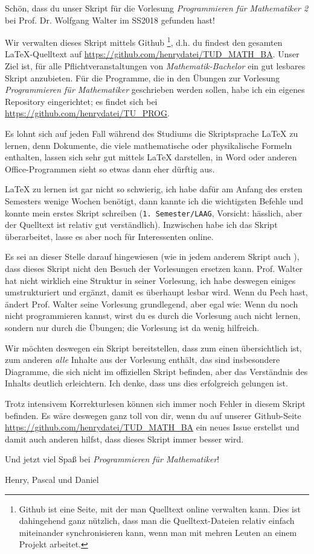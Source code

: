 Schön, dass du unser Skript für die Vorlesung \textit{Programmieren für Mathematiker 2} bei Prof. Dr. Wolfgang Walter im SS2018 gefunden hast!

Wir verwalten dieses Skript mittels Github \footnote{Github ist eine Seite, mit der man Quelltext online verwalten kann. Dies ist dahingehend ganz nützlich, dass man die Quelltext-Dateien relativ einfach miteinander synchronisieren kann, wenn man mit mehren Leuten an einem Projekt arbeitet.}, d.h. du findest den gesamten \LaTeX-Quelltext auf \url{https://github.com/henrydatei/TUD_MATH_BA}. Unser Ziel ist, für alle Pflichtveranstaltungen von \textit{Mathematik-Bachelor} ein gut lesbares Skript anzubieten. Für die Programme, die in den Übungen zur Vorlesung \textit{Programmieren für Mathematiker} geschrieben werden sollen, habe ich ein eigenes Repository eingerichtet; es findet sich bei \url{https://github.com/henrydatei/TU_PROG}.

Es lohnt sich auf jeden Fall während des Studiums die Skriptsprache \LaTeX{} zu lernen, denn Dokumente, die viele mathematische oder physikalische Formeln enthalten, lassen sich sehr gut mittels \LaTeX{} darstellen, in Word oder anderen Office-Programmen sieht so etwas dann eher dürftig aus.

\LaTeX{} zu lernen ist gar nicht so schwierig, ich habe dafür am Anfang des ersten Semesters wenige Wochen benötigt, dann kannte ich die wichtigsten Befehle und konnte mein erstes Skript schreiben (\texttt{1. Semester/LAAG}, Vorsicht: hässlich, aber der Quelltext ist relativ gut verständlich). Inzwischen habe ich das Skript überarbeitet, lasse es aber noch für Interessenten online.

Es sei an dieser Stelle darauf hingewiesen (wie in jedem anderem Skript auch \smiley{}), dass dieses Skript nicht den Besuch der Vorlesungen ersetzen kann. Prof. Walter hat nicht wirklich eine Struktur in seiner Vorlesung, ich habe deswegen einiges umstrukturiert und ergänzt, damit es überhaupt lesbar wird. Wenn du Pech hast, ändert Prof. Walter seine Vorlesung grundlegend, aber egal wie: Wenn du noch nicht programmieren kannst, wirst du es durch die Vorlesung auch nicht lernen, sondern nur durch die Übungen; die Vorlesung ist da wenig hilfreich.

Wir möchten deswegen ein Skript bereitstellen, dass zum einen übersichtlich ist, zum anderen \textit{alle} Inhalte aus der Vorlesung enthält, das sind insbesondere Diagramme, die sich nicht im offiziellen Skript befinden, aber das Verständnis des Inhalts deutlich erleichtern. Ich denke, dass uns dies erfolgreich gelungen ist.

Trotz intensivem Korrekturlesen können sich immer noch Fehler in diesem Skript befinden. Es wäre deswegen ganz toll von dir, wenn du auf unserer Github-Seite \url{https://github.com/henrydatei/TUD_MATH_BA} ein neues Issue erstellst und damit auch anderen hilfst, dass dieses Skript immer besser wird.

Und jetzt viel Spaß bei \textit{Programmieren für Mathematiker}!

\begin{flushright}
	Henry, Pascal und Daniel
\end{flushright}